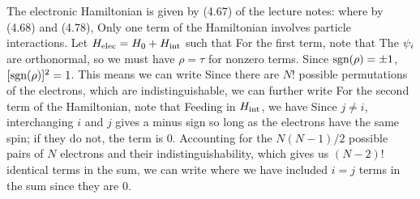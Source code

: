{	The electronic Hamiltonian is given by (4.67) of the lecture notes:
	where by (4.68) and (4.78),
	Only one term of the Hamiltonian involves particle interactions.  Let $H_\text{elec} = H_0 + H_\text{int}$ such that
	For the first term, note that
	The $\psi_i$ are orthonormal, so we must have $\rho = \tau$ for nonzero terms.  Since $\text{sgn}(\rho) = \pm 1$, $[\text{sgn}(\rho)]^2 = 1$.  This means we can write
	Since there are $N!$ possible permutations of the electrons, which are indistinguishable, we can further write
	For the second term of the Hamiltonian, note that
	Feeding in $H_\text{int}$, we have
	Since $j \neq i$, interchanging $i$ and $j$ gives a minus sign so long as the electrons have the same spin; if they do not, the term is 0.  Accounting for the $N (N - 1) / 2$ possible pairs of $N$ electrons and their indistinguishability, which gives us $(N - 2)!$ identical terms in the sum, we can write
	where we have included $i = j$ terms in the sum since they are 0.
	
}
